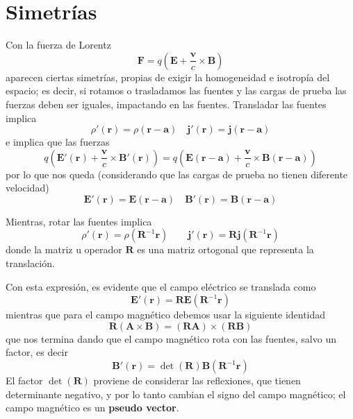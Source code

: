 ﻿\documentclass{article}
\numberwithin{equation}{section} %
\renewcommand{\vec}[1]{\boldsymbol{#1}}
\begin{document}
\section{Simetrías}
Con la fuerza de Lorentz
\begin{equation}
\vec{F} = q \left(\vec{E} + \frac{\vec{v}}{c} \times \vec{B}\right)
\end{equation}
aparecen ciertas simetrías, propias de exigir la homogeneidad e isotropía del espacio; es decir, si rotamos o trasladamos las fuentes y las cargas de prueba las fuerzas deben ser iguales, impactando en las fuentes.
Transladar las fuentes implica
\begin{equation}
\rho'(\vec{r}) = \rho(\vec{r} - \vec{a}) \quad \vec{j}'(\vec{r}) = \vec{j}(\vec{r} - \vec{a})
\end{equation}
e implica que las fuerzas
\[q \left(\vec{E}'(\vec{r}) + \frac{\vec{v}}{c} \times \vec{B}'(\vec{r})\right) = q \left(\vec{E}(\vec{r} - \vec{a}) + \frac{\vec{v}}{c} \times \vec{B}(\vec{r} - \vec{a})\right)\]
por lo que nos queda (considerando que las cargas de prueba no tienen diferente velocidad)
\begin{equation}
\vec{E}'(\vec{r}) = \vec{E}(\vec{r} - \vec{a}) \quad \vec{B}'(\vec{r}) = \vec{B}(\vec{r} - \vec{a})
\end{equation}

Mientras, rotar las fuentes implica 
\begin{equation}
\rho'(\vec{r}) = \rho(\vec{R}^{-1} \vec{r}) \qquad \vec{j}'(\vec{r}) = \vec{R}\vec{j}(\vec{R}^{-1} \vec{r})
\end{equation}
donde la matriz u operador $\vec{R}$ es una matriz ortogonal que representa la translación. 

Con esta expresión, es evidente que el campo eléctrico se translada como
\begin{equation}
\vec{E}'(\vec{r}) = \vec{R} \vec{E}(\vec{R}^{-1} \vec{r})
\end{equation}
mientras que para el campo magnético debemos usar la siguiente identidad
\begin{equation}
\vec{R} (\vec{A} \times \vec{B}) = (\vec{R} \vec{A}) \times (\vec{R} \vec{B})
\end{equation}
que nos termina dando que el campo magnético rota con las fuentes, salvo un factor, es decir
\begin{equation}
\vec{B}'(\vec{r}) = \det(\vec{R}) \vec{B}(\vec{R}^{-1} \vec{r})
\end{equation}
El factor $\det(\vec{R})$ proviene de considerar las reflexiones, que tienen determinante negativo, y por lo tanto cambian el signo del campo magnético; el campo magnético es un \textbf{pseudo vector}.
\end{document}
